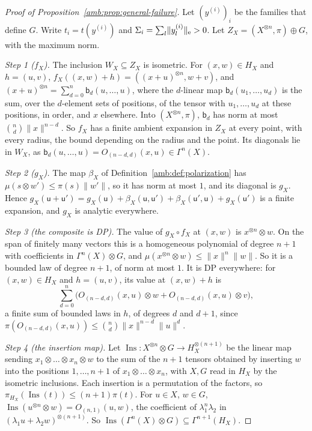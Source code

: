 \documentclass[11pt]{amsart}
\theoremstyle{definition}
\theoremstyle{remark}
\numberwithin{equation}{section}
\newcommand{\norm}[1]{\lVert #1\rVert}
\theoremstyle{plain}
\theoremstyle{definition}
\theoremstyle{plain}
\begin{document}
\begin{proof}[Proof of Proposition~\ref{amb:prop:general-failure}]
Let $(y^{(i)})_i$ be the families that define $G$. Write $t_i=t(y^{(i)})$ and $\Sigma_i=\sum_l\norm{y^{(i)}_l}_{\rm e}>0$. Let $Z_X=(X^{\otimes n},\pi)\oplus G$, with the maximum norm.

\emph{Step 1 ($f_X$).} The inclusion $W_X\subseteq Z_X$ is isometric. For $(x,w)\in H_X$ and $h=(u,v)$, $f_X((x,w)+h)=((x+u)^{\otimes n},w+v)$, and $(x+u)^{\otimes n}=\sum_{d=0}^n\mathsf b_d(u,\dots,u)$, where the $d$-linear map $\mathsf b_d(u_1,\dots,u_d)$ is the sum, over the $d$-element sets of positions, of the tensor with $u_1,\dots,u_d$ at these positions, in order, and $x$ elsewhere. Into $(X^{\otimes n},\pi)$, $\mathsf b_d$ has norm at most $\binom nd\norm x^{n-d}$. So $f_X$ has a finite ambient expansion in $Z_X$ at every point, with every radius, the bound depending on the radius and the point. Its diagonals lie in $W_X$, as $\mathsf b_d(u,\dots,u)=O_{(n-d,d)}(x,u)\in\Gamma^n(X)$.

\emph{Step 2 ($g_X$).} The map $\beta_X$ of Definition~\ref{amb:def:polarization} has $\mu(s\otimes w')\le\pi(s)\norm{w'}$, so it has norm at most $1$, and its diagonal is $g_X$. Hence $g_X(\mathsf u+\mathsf u')=g_X(\mathsf u)+\beta_X(\mathsf u,\mathsf u')+\beta_X(\mathsf u',\mathsf u)+g_X(\mathsf u')$ is a finite expansion, and $g_X$ is analytic everywhere.

\emph{Step 3 (the composite is DP).} The value of $g_X\circ f_X$ at $(x,w)$ is $x^{\otimes n}\otimes w$. On the span of finitely many vectors this is a homogeneous polynomial of degree $n+1$ with coefficients in $\Gamma^n(X)\otimes G$, and $\mu(x^{\otimes n}\otimes w)\le\norm x^n\norm w$. So it is a bounded law of degree $n+1$, of norm at most $1$. It is DP everywhere: for $(x,w)\in H_X$ and $h=(u,v)$, its value at $(x,w)+h$ is
\[
 \sum_{d=0}^n\bigl(O_{(n-d,d)}(x,u)\otimes w+O_{(n-d,d)}(x,u)\otimes v\bigr),
\]
a finite sum of bounded laws in $h$, of degrees $d$ and $d+1$, since $\pi(O_{(n-d,d)}(x,u))\le\binom nd\norm x^{n-d}\norm u^d$.

\emph{Step 4 (the insertion map).} Let $\operatorname{Ins}\colon X^{\otimes n}\otimes G\to H_X^{\otimes(n+1)}$ be the linear map sending $x_1\otimes\dots\otimes x_n\otimes w$ to the sum of the $n+1$ tensors obtained by inserting $w$ into the positions $1,\dots,n+1$ of $x_1\otimes\dots\otimes x_n$, with $X,G$ read in $H_X$ by the isometric inclusions. Each insertion is a permutation of the factors, so $\pi_{H_X}(\operatorname{Ins}(t))\le(n+1)\pi(t)$. For $u\in X$, $w\in G$, $\operatorname{Ins}(u^{\otimes n}\otimes w)=O_{(n,1)}(u,w)$, the coefficient of $\lambda_1^n\lambda_2$ in $(\lambda_1u+\lambda_2w)^{\otimes(n+1)}$. So $\operatorname{Ins}(\Gamma^n(X)\otimes G)\subseteq\Gamma^{n+1}(H_X)$.


\end{proof}
\end{document}
